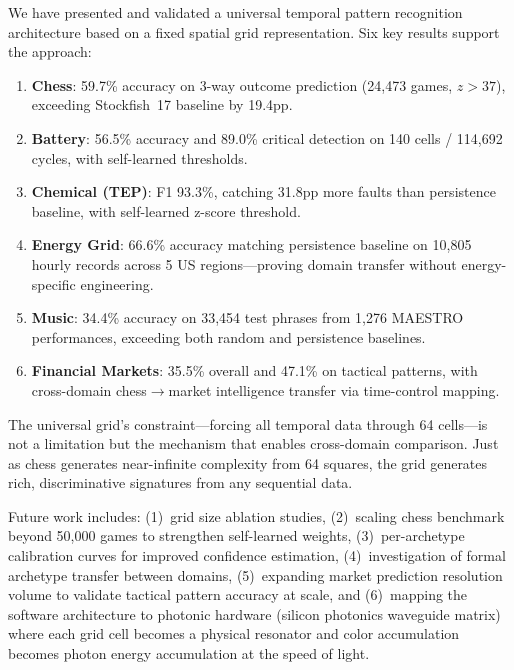 \documentclass[11pt,a4paper]{article}
\begin{document}
We have presented and validated a universal temporal pattern recognition architecture
based on a fixed spatial grid representation. Six key results support the approach:

\begin{enumerate}
    \item \textbf{Chess}: 59.7\% accuracy on 3-way outcome prediction (24,473 games,
    $z>37$), exceeding Stockfish~17 baseline by 19.4pp.
    \item \textbf{Battery}: 56.5\% accuracy and 89.0\% critical detection on 140 cells /
    114,692 cycles, with self-learned thresholds.
    \item \textbf{Chemical (TEP)}: F1 93.3\%, catching 31.8pp more faults than
    persistence baseline, with self-learned z-score threshold.
    \item \textbf{Energy Grid}: 66.6\% accuracy matching persistence baseline on
    10,805 hourly records across 5 US regions---proving domain transfer without
    energy-specific engineering.
    \item \textbf{Music}: 34.4\% accuracy on 33,454 test phrases from 1,276 MAESTRO
    performances, exceeding both random and persistence baselines.
    \item \textbf{Financial Markets}: 35.5\% overall and 47.1\% on tactical patterns,
    with cross-domain chess$\to$market intelligence transfer via time-control mapping.
\end{enumerate}

The universal grid's constraint---forcing all temporal data through 64 cells---is not a
limitation but the mechanism that enables cross-domain comparison. Just as chess
generates near-infinite complexity from 64 squares, the grid generates rich,
discriminative signatures from any sequential data.

Future work includes: (1)~grid size ablation studies, (2)~scaling chess benchmark
beyond 50,000 games to strengthen self-learned weights, (3)~per-archetype calibration
curves for improved confidence estimation, (4)~investigation of formal archetype
transfer between domains, (5)~expanding market prediction resolution volume to
validate tactical pattern accuracy at scale, and (6)~mapping the software
architecture to photonic hardware (silicon photonics waveguide matrix) where each
grid cell becomes a physical resonator and color accumulation becomes photon energy
accumulation at the speed of light.

\end{document}
